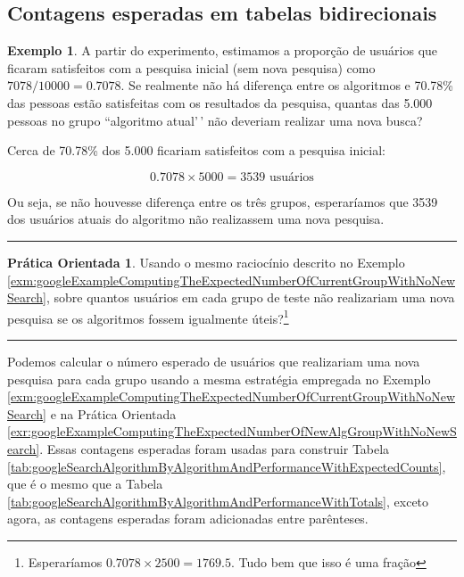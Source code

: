 \documentclass[
]{book}
\theoremstyle{definition}
\theoremstyle{definition}
\newtheorem{example}{Exemplo}[chapter]
\theoremstyle{definition}
\newtheorem{exercise}{Prática Orientada}[chapter]
\theoremstyle{definition}
\theoremstyle{remark}
\begin{document}
\hypertarget{expectedCountsBidirectionalTables}{%
\subsection{Contagens esperadas em tabelas bidirecionais}\label{expectedCountsBidirectionalTables}}

\begin{example}
\protect\hypertarget{exm:googleExampleComputingTheExpectedNumberOfCurrentGroupWithNoNewSearch}{}{\label{exm:googleExampleComputingTheExpectedNumberOfCurrentGroupWithNoNewSearch} }A partir do experimento, estimamos a proporção de usuários que ficaram satisfeitos com a pesquisa inicial (sem nova pesquisa) como \(7078/10000 = 0.7078\). Se realmente não há diferença entre os algoritmos e 70.78\% das pessoas estão satisfeitas com os resultados da pesquisa, quantas das 5.000 pessoas no grupo ``algoritmo atual'\,' não deveriam realizar uma nova busca?
\end{example}

Cerca de 70.78\% dos 5.000 ficariam satisfeitos com a pesquisa inicial:

\[ 0.7078 \times 5000 = 3539 \text{ usuários} \]

Ou seja, se não houvesse diferença entre os três grupos, esperaríamos que 3539 dos usuários atuais do algoritmo não realizassem uma nova pesquisa.

\begin{center}\rule{0.5\linewidth}{0.5pt}\end{center}

\begin{exercise}
\protect\hypertarget{exr:googleExampleComputingTheExpectedNumberOfNewAlgGroupWithNoNewSearch}{}{\label{exr:googleExampleComputingTheExpectedNumberOfNewAlgGroupWithNoNewSearch} }Usando o mesmo raciocínio descrito no Exemplo \ref{exm:googleExampleComputingTheExpectedNumberOfCurrentGroupWithNoNewSearch}, sobre quantos usuários em cada grupo de teste não realizariam uma nova pesquisa se os algoritmos fossem igualmente úteis?\footnote{Esperaríamos \(0.7078 \times 2500 = 1769.5\). Tudo bem que isso é uma fração}
\end{exercise}

\begin{center}\rule{0.5\linewidth}{0.5pt}\end{center}

Podemos calcular o número esperado de usuários que realizariam uma nova pesquisa para cada grupo usando a mesma estratégia empregada no Exemplo \ref{exm:googleExampleComputingTheExpectedNumberOfCurrentGroupWithNoNewSearch} e na Prática Orientada \ref{exr:googleExampleComputingTheExpectedNumberOfNewAlgGroupWithNoNewSearch}. Essas contagens esperadas foram usadas para construir Tabela \ref{tab:googleSearchAlgorithmByAlgorithmAndPerformanceWithExpectedCounts}, que é o mesmo que a Tabela \ref{tab:googleSearchAlgorithmByAlgorithmAndPerformanceWithTotals}, exceto agora, as contagens esperadas foram adicionadas entre parênteses.
\end{document}
